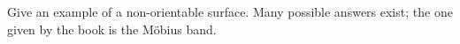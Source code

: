{Give an example of a non-orientable surface.
}
{Many possible answers exist; the one given by the book is the M\"obius band.
}
